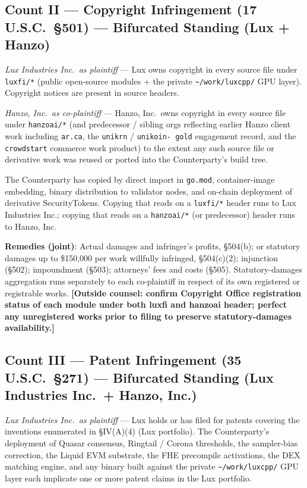 \documentclass[11pt,letterpaper]{article}
\begin{document}
\subsection*{Count II --- Copyright Infringement (17 U.S.C.\ \S 501) --- Bifurcated Standing (Lux + Hanzo)}

\textit{Lux Industries Inc.\ as plaintiff} --- Lux owns copyright
in every source file under \texttt{luxfi/*} (public open-source
modules + the private \texttt{\textasciitilde/work/luxcpp/}
GPU layer). Copyright notices are present in source headers.

\textit{Hanzo, Inc.\ as co-plaintiff} --- Hanzo, Inc.\ owns
copyright in every source file under \texttt{hanzoai/*} (and
predecessor / sibling orgs reflecting earlier Hanzo client work
including \texttt{ar.ca}, the \texttt{unikrn} / \texttt{unikoin-
gold} engagement record, and the \texttt{crowdstart} commerce
work product) to the extent any such source file or derivative
work was reused or ported into the Counterparty's build tree.

The Counterparty has copied by direct import in \texttt{go.mod},
container-image embedding, binary distribution to validator nodes,
and on-chain deployment of derivative SecurityTokens. Copying that
reads on a \texttt{luxfi/*} header runs to Lux Industries Inc.;
copying that reads on a \texttt{hanzoai/*} (or predecessor)
header runs to Hanzo, Inc.

\textbf{Remedies (joint)}: Actual damages and infringer's profits,
\S 504(b); or statutory damages up to \$150,000 per work willfully
infringed, \S 504(c)(2); injunction (\S 502); impoundment (\S 503);
attorneys' fees and costs (\S 505). Statutory-damages aggregation
runs separately to each co-plaintiff in respect of its own
registered or registrable works. \textbf{[Outside counsel: confirm
Copyright Office registration status of each module under both
luxfi and hanzoai header; perfect any unregistered works prior to
filing to preserve statutory-damages availability.]}

\subsection*{Count III --- Patent Infringement (35 U.S.C.\ \S 271) --- Bifurcated Standing (Lux Industries Inc.\ + Hanzo, Inc.)}

\textit{Lux Industries Inc.\ as plaintiff} --- Lux holds or has
filed for patents covering the inventions enumerated in
\S IV(A)(4) (Lux portfolio). The Counterparty's deployment of
Quasar consensus, Ringtail / Corona thresholds, the sampler-bias
correction, the Liquid EVM substrate, the FHE precompile
activations, the DEX matching engine, and any binary built against
the private \texttt{\textasciitilde/work/luxcpp/} GPU layer each
implicate one or more patent claims in the Lux portfolio.
\end{document}
